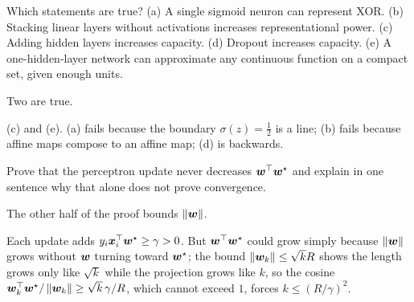 \begin{problem}\onechili
	Which statements are true? (a) A single sigmoid neuron can represent XOR.
	(b) Stacking linear layers without activations increases representational power.
	(c) Adding hidden layers increases capacity. (d) Dropout increases capacity.
	(e) A one-hidden-layer network can approximate any continuous function on a
	compact set, given enough units.
	\begin{hint}Two are true.\end{hint}
	\begin{sol}
		(c) and (e). (a) fails because the boundary $\sigma(z)=\tfrac12$ is a line;
		(b) fails because affine maps compose to an affine map; (d) is backwards.
	\end{sol}
\end{problem}

\begin{problem}\twochili
	Prove that the perceptron update never decreases ${\bm{w}}^{\top}{\bm{w}}^\star$ and explain in
	one sentence why that alone does not prove convergence.
	\begin{hint}The other half of the proof bounds $\left\lVert {\bm{w}} \right\rVert$.\end{hint}
	\begin{sol}
		Each update adds $y_i{\bm{x}}_i^{\top}{\bm{w}}^\star\ge\gamma>0$. But ${\bm{w}}^{\top}{\bm{w}}^\star$ could grow
		simply because $\left\lVert {\bm{w}} \right\rVert$ grows without ${\bm{w}}$ turning toward ${\bm{w}}^\star$; the bound
		$\left\lVert {\bm{w}}_k \right\rVert\le\sqrt{k}R$ shows the length grows only like $\sqrt k$ while the
		projection grows like $k$, so the cosine ${\bm{w}}_k^{\top}{\bm{w}}^\star/\left\lVert {\bm{w}}_k \right\rVert\ge\sqrt{k}\,\gamma/R$,
		which cannot exceed $1$, forces $k\le(R/\gamma)^2$.
	\end{sol}
\end{problem}
